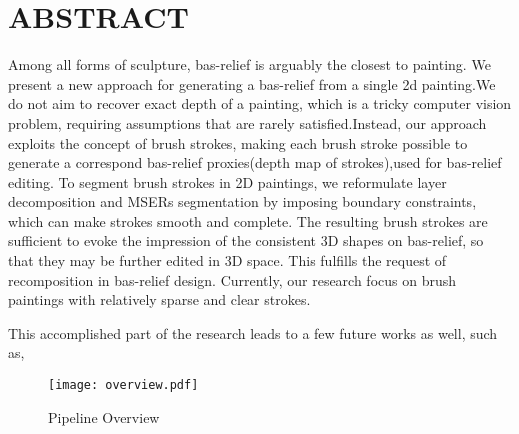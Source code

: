 \section*{\centering ABSTRACT}

Among all forms of sculpture, bas-relief is arguably the closest to painting. We present a new approach for generating a bas-relief from a single 2d painting.We do not aim to recover exact depth of a painting, which is a tricky computer vision problem, requiring assumptions that are rarely satisfied.Instead, our approach exploits the concept of brush strokes, making each brush stroke possible to generate a correspond bas-relief proxies(depth map of strokes),used for bas-relief editing. To segment brush strokes in 2D paintings, we reformulate layer decomposition and MSERs segmentation by imposing boundary constraints, which can make strokes smooth and complete. The resulting brush strokes are sufficient to evoke the impression of the consistent 3D shapes on bas-relief, so that they may be further edited in 3D space. This fulfills the request of recomposition in bas-relief design. Currently, our research focus on brush paintings with relatively sparse and clear strokes. 

This accomplished part of the research leads to a few future works as well, such as, 


\begin{figure}[H]
\centering
\texttt{[image: overview.pdf]}
\caption{Pipeline Overview}
\label{pip}
\end{figure} 
 
\newpage


 

